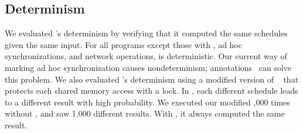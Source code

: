 





\subsection{Determinism} \label{sec:parrot-determinism}

We evaluated \parrot's determinism by verifying that it computed the same
schedules given the same input.  For all programs except those with
\nondets, ad hoc synchronizations, and network operations, \parrot is
deterministic.  Our current way of marking ad hoc synchronization causes
nondeterminism; annotations~\cite{syncfinder:osdi10} can solve this
problem.  We also evaluated \parrot's determinism using a modified version of
\racey~\cite{racy-stress} that protects each shared memory access with a
lock.  In \racey, each different schedule leads to a different result with
high probability.  We executed our modified ,000 times without
\parrot, and saw 1,000 different results.  With \parrot, it always computed the
same result.

